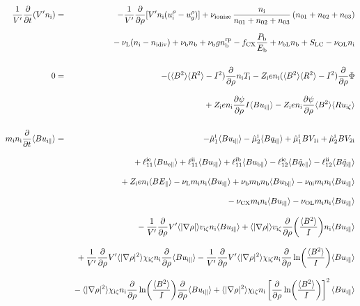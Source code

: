 \documentclass[11pt]{article}
\def\r#1{{\rm#1}}
\def\aves#1{\langle#1\rangle}
\def\dd#1#2{\frac{\partial #1}{\partial #2}}
\def\para{\parallel}
\def\ddrho{\frac{\partial}{\partial\rho}}
\def\mi{m_\r{i}}
\def\mb{m_\r{b}}
\def\ni{n_\r{i}}
\def\nb{n_\r{b}}
\def\nna{n_{01}}
\def\nnb{n_{02}}
\def\nnc{n_{03}}
\def\Ti{T_\r{i}}
\def\Zi{Z_\r{i}}
\def\Pb{P_\r{b}}
\def\Eb{E_\r{b}}
\def\uizt{u_{\r{i}\zeta}}
\def\uepara{u_{\r{e}\para}}
\def\uipara{u_{\r{i}\para}}
\def\ubpara{u_{\r{b}\para}}
\def\qipara{q_{\r{i}\para}}
\def\qhatepara{\hat{q}_{\r{e}\para}}
\def\qhatipara{\hat{q}_{\r{i}\para}}
\def\uirho{u_\r{i}^\rho}
\def\ugrho{u_{g}^\rho}
\def\bri{\aves{B^2}\aves{R^2} - I^2}
\def\ddt{\frac{\partial}{\partial t}}
\def\nbrp{n_\r{b}^\r{rp}}
\def\fCX{f_\r{CX}}
\def\nuni{\nu_\r{0i}}
\def\nuL{\nu_\r{L}}
\def\nuCX{\nu_\r{CX}}
\def\nuion{\nu_\r{ionize}}
\def\nub{\nu_\r{b}}
\def\nidiv{n_\r{idiv}}
\def\nuOL{\nu_\r{OL}}
\def\nubL{\nu_\r{bL}}
\begin{document}
%
\begin{eqnarray}
  \frac{1}{V'} \ddt ( V' \ni ) &=&
%
  - \frac{1}{V'} \ddrho [ V' \ni (\uirho - \ugrho) ]
%
  + \nuion\, \frac{\ni}{\nna + \nnb + \nnc}\, (\nna + \nnb
  + \nnc)
%
\nonumber\\[2.5mm]&&{}
  - \nuL (\ni - \nidiv) 
%
  + \nub \nb
%
  + \nub g \nbrp
%
  - \fCX \frac{\Pb}{\Eb}
%
  + \nubL \nb
%
  + S_\r{LC}
%
  - \nuOL \ni
%
\\[5mm]
  0 &=&
%
  -           ( \bri ) \ddrho \ni \Ti
%
  - \Zi e \ni ( \bri ) \ddrho \Phi
\nonumber\\[3mm]&&{}
%
  + \Zi e \ni \dd{\psi}{\rho} I          \aves{B\uipara}
%
  - \Zi e \ni \dd{\psi}{\rho} \aves{B^2} \aves{R\uizt}
\\[5mm]
  \mi \ni \ddt \aves{B \uipara} &=&
%
  - \hat{\mu}_1^\r{i} \aves{B \uipara} 
  - \hat{\mu}_2^\r{i} \aves{B \qipara}
%
  + \hat{\mu}_1^\r{i} {B V_{1\r{i}}} 
  + \hat{\mu}_2^\r{i} {B V_{2\r{i}}}
\nonumber\\[3mm]&&{}
%
  + \ell_{11}^{\r{ie}} \aves{B \uepara}
  + \ell_{11}^{\r{ii}} \aves{B \uipara}
  + \ell_{11}^{\r{ib}} \aves{B \ubpara}
%
  - \ell_{12}^{\r{ie}} \aves{B \qhatepara}
  - \ell_{12}^{\r{ii}} \aves{B \qhatipara}
\nonumber\\[3mm]&&{}
%
  + \Zi e \ni \aves{B E_\para}
%
%
%
  - \nuL  \mi \ni \aves{B \uipara}
%
  + \nub  \mb \nb \aves{B \ubpara}
%
  - \nuni \mi \ni \aves{B \uipara}
\nonumber\\[3mm]&&{}
%
  - \nuCX \mi \ni \aves{B \uipara}
%
  - \nuOL \mi \ni \aves{B \uipara}
\nonumber\\[3mm]&&{}
%
  - \frac{1}{V'} \ddrho V' \aves{|\nabla \rho|} v_{\r{i}\zeta} \ni \aves{B \uipara}
%
  + \aves{|\nabla \rho|} v_{\r{i}\zeta} \ddrho
  \biggl(\frac{\aves{B^2}}{I}\biggl) \ni \aves{B \uipara}
\nonumber\\[3mm]&&{}
%
  + \frac{1}{V'} \ddrho V' \aves{|\nabla \rho|^2} \chi_{\r{i}\zeta} \ni
  \ddrho \aves{B \uipara}
%
  - \frac{1}{V'} \ddrho V' \aves{|\nabla \rho|^2} \chi_{\r{i}\zeta} \ni \ddrho
  \ln\biggl(\frac{\aves{B^2}}{I}\biggr) \aves{B \uipara}
\nonumber\\[3mm]&&{}
%
  - \aves{|\nabla \rho|^2} \chi_{\r{i}\zeta} \ni \ddrho
  \ln\biggl(\frac{\aves{B^2}}{I}\biggr) \ddrho \aves{B \uipara}
%
  + \aves{|\nabla \rho|^2} \chi_{\r{i}\zeta} \ni \left[\ddrho
  \ln\biggl(\frac{\aves{B^2}}{I}\biggr)\right]^2 \aves{B \uipara}

\end{eqnarray}
\end{document}

